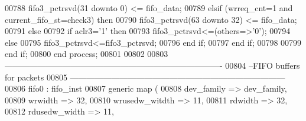 \begin{DoxyCode}
00788             \textcolor{vhdlchar}{fifo3_pctrsvd}\textcolor{vhdlchar}{(}\textcolor{vhdllogic}{}\textcolor{vhdllogic}{31} \textcolor{keywordflow}{downto} \textcolor{vhdllogic}{}\textcolor{vhdllogic}{0}\textcolor{vhdlchar}{)} \textcolor{vhdlchar}{<=} \textcolor{vhdlchar}{fifo_data};
00789           \textcolor{keywordflow}{elsif} \textcolor{vhdlchar}{(}\textcolor{vhdlchar}{wrreq_cnt}\textcolor{vhdlchar}{=}\textcolor{vhdllogic}{}\textcolor{vhdllogic}{1} \textcolor{keywordflow}{and} \textcolor{vhdlchar}{current_fifo_st}\textcolor{vhdlchar}{=}\textcolor{vhdlchar}{check3}\textcolor{vhdlchar}{)} \textcolor{keywordflow}{then}
00790             \textcolor{vhdlchar}{fifo3_pctrsvd}\textcolor{vhdlchar}{(}\textcolor{vhdllogic}{}\textcolor{vhdllogic}{63} \textcolor{keywordflow}{downto} \textcolor{vhdllogic}{}\textcolor{vhdllogic}{32}\textcolor{vhdlchar}{)} \textcolor{vhdlchar}{<=} \textcolor{vhdlchar}{fifo_data}; 
00791           \textcolor{keywordflow}{else}
00792             \textcolor{keywordflow}{if} \textcolor{vhdlchar}{aclr3}\textcolor{vhdlchar}{=}\textcolor{vhdlchar}{'}\textcolor{vhdllogic}{}\textcolor{vhdllogic}{1}\textcolor{vhdlchar}{'} \textcolor{keywordflow}{then} 
00793               \textcolor{vhdlchar}{fifo3_pctrsvd}\textcolor{vhdlchar}{<=}\textcolor{vhdlchar}{(}\textcolor{keywordflow}{others}\textcolor{vhdlchar}{=}\textcolor{vhdlchar}{>}\textcolor{vhdlchar}{'}\textcolor{vhdllogic}{}\textcolor{vhdllogic}{0}\textcolor{vhdlchar}{'}\textcolor{vhdlchar}{)};
00794             \textcolor{keywordflow}{else}  
00795               \textcolor{vhdlchar}{fifo3_pctrsvd}\textcolor{vhdlchar}{<=}\textcolor{vhdlchar}{fifo3_pctrsvd};
00796             \textcolor{keywordflow}{end} \textcolor{keywordflow}{if};
00797           \textcolor{keywordflow}{end} \textcolor{keywordflow}{if};           
00798 
00799         \textcolor{keywordflow}{end} \textcolor{keywordflow}{if};
00800     \textcolor{keywordflow}{end} \textcolor{keywordflow}{process};      
00801 
00802   
00803 \textcolor{keyword}{-------------------------------------------------------------------------------}
00804 \textcolor{keyword}{--FIFO buffers for packets}
00805 \textcolor{keyword}{------------------------------------------------------------------------------  }
00806   fifo0 :  fifo_inst 
00807   \textcolor{keywordflow}{generic} \textcolor{keywordflow}{map} (
00808             dev_family      => dev_family, 
00809             wrwidth         => \textcolor{vhdllogic}{32}, 
00810             wrusedw_witdth  => \textcolor{vhdllogic}{11}, 
00811             rdwidth         => \textcolor{vhdllogic}{32}, 
00812             rdusedw_width   => \textcolor{vhdllogic}{11},

\end{DoxyCode}
